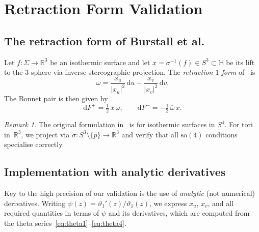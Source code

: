 \documentclass[11pt,a4paper]{article}
\theoremstyle{plain}
\theoremstyle{definition}
\theoremstyle{remark}
\newtheorem{remark}[theorem]{Remark}
\newcommand{\vt}[1]{\vartheta_{#1}}     %
\newcommand{\RR}{\mathbb{R}}
\newcommand{\HH}{\mathbb{H}}            %
\newcommand{\dd}{\mathrm{d}}
\newcommand{\abs}[1]{\lvert #1 \rvert}
\begin{document}
\section{Retraction Form Validation}\label{sec:retraction}

\subsection{The retraction form of Burstall et al.}
\label{sec:retraction-theory}
Let $f \colon \Sigma \to \RR^3$ be an isothermic surface and let
$x = \sigma^{-1}(f) \in S^3 \subset \HH$ be its lift to the
$3$-sphere via inverse stereographic projection.  The
\emph{retraction $1$-form} of~\cite{BCHR25} is
\begin{equation}
  \omega = \frac{x_u}{\abs{x_u}^2}\,\dd u
    - \frac{x_v}{\abs{x_v}^2}\,\dd v.
  \label{eq:omega}
\end{equation}
The Bonnet pair is then given by
\begin{equation}
  \dd F^+ = \tfrac12\,\bar{x}\,\omega,
  \qquad
  \dd F^- = -\tfrac12\,\bar{\omega}\,x.
  \label{eq:Fpm}
\end{equation}

\begin{remark}
  The original formulation in~\cite{BCHR25} is for isothermic
  surfaces in $S^4$.  For tori in~$\RR^3$, we project via
  $\sigma \colon S^3 \setminus \{p\} \to \RR^3$ and verify that
  all $\mathrm{so}(4)$ conditions specialise correctly.
\end{remark}

\subsection{Implementation with analytic derivatives}
\label{sec:retraction-impl}
Key to the high precision of our validation is the use of
\emph{analytic} (not numerical) derivatives.  Writing
$\psi(z) = \vt{1}'(z)/\vt{1}(z)$, we express $x_u$, $x_v$, and all
required quantities in terms of $\psi$ and its derivatives, which are
computed from the theta series~\eqref{eq:theta1}--\eqref{eq:theta4}.
\end{document}
